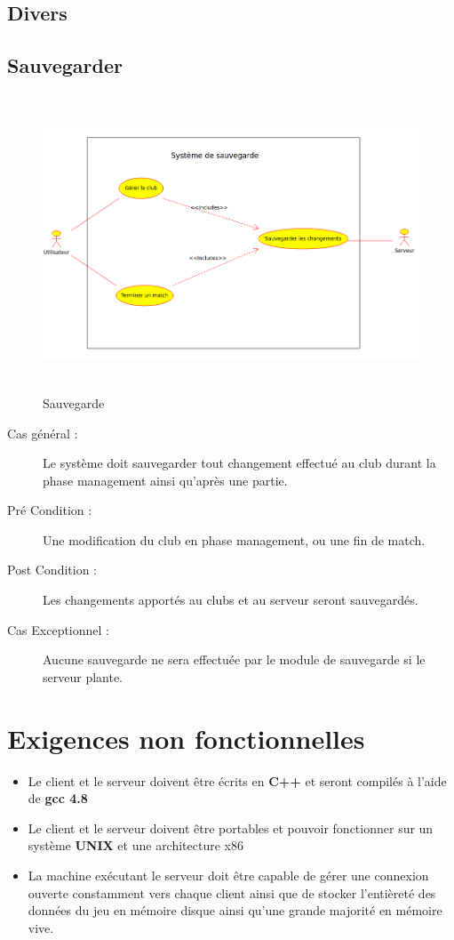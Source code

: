 \documentclass[a4paper]{report}
\begin{document}
\subsection{Divers}
\subsection{Sauvegarder}
\begin{figure}[h]
    \caption{\label{1} Sauvegarde}
    \begin{center}
        \includegraphics[height=250pt]{uml/svg.png}
    \end{center}
\end{figure}
\begin{description}
    \item[Cas général :] Le système doit sauvegarder tout changement effectué au \gls{club} durant la phase management ainsi qu'après une partie.
    \item[Pré Condition  :] Une modification du \gls{club} en phase management, ou une fin de match.
    \item[Post Condition :] Les changements apportés au \glspl{club} et au \gls{serveur} seront sauvegardés.
    \item[Cas Exceptionnel :] Aucune sauvegarde ne sera effectuée par le module de sauvegarde si le \gls{serveur} plante.
\end{description}


\section{Exigences non fonctionnelles}
\label{enf}
\begin{itemize}
    \item Le \gls{client} et le \gls{serveur} doivent être écrits en \textbf{C++} et seront compilés à l'aide de \textbf{gcc 4.8}
    \item Le \gls{client} et le \gls{serveur} doivent être portables et pouvoir fonctionner sur un système \textbf{UNIX} et une architecture x86
    \item La machine exécutant le \gls{serveur} doit être capable de gérer une connexion ouverte constamment vers chaque \gls{client} ainsi que de stocker l'entièreté des données du jeu en mémoire disque ainsi qu'une grande majorité en mémoire vive.
\end{itemize}
\end{document}
